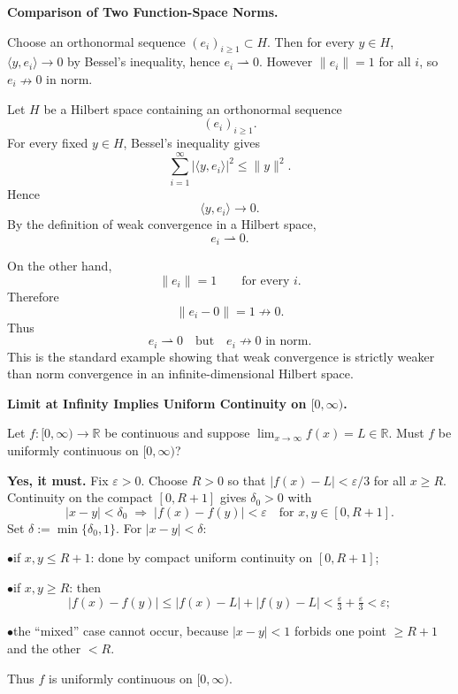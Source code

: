 \begin{problem}[CP-II-0263]
\label{prob:cp-ii-0263}
\textbf{Comparison of Two Function-Space Norms.}

\hspace*{1.5em}Choose an orthonormal sequence $(e_i)_{i\ge1}\subset H$.
		Then for every $y\in H$,
		$\langle y,e_i\rangle\to0$ by Bessel's inequality,
		hence $e_i\rightharpoonup0$.
		However $\|e_i\|=1$ for all $i$,
		so $e_i\nrightarrow0$ in norm.
\end{problem}

\begin{solution}
Let \(H\) be a Hilbert space containing an orthonormal sequence
\[
(e_i)_{i\ge1}.
\]
For every fixed \(y\in H\), Bessel's inequality gives
\[
\sum_{i=1}^{\infty}|\langle y,e_i\rangle|^2\le \|y\|^2.
\]
Hence
\[
\langle y,e_i\rangle\to0.
\]
By the definition of weak convergence in a Hilbert space,
\[
\boxed{e_i\rightharpoonup0.}
\]

On the other hand,
\[
\|e_i\|=1
\qquad\text{for every }i.
\]
Therefore
\[
\|e_i-0\|=1\nrightarrow0.
\]
Thus
\[
\boxed{
e_i\rightharpoonup0
\quad\text{but}\quad
e_i\not\to0\text{ in norm}.
}
\]
This is the standard example showing that weak convergence is strictly weaker than norm
convergence in an infinite-dimensional Hilbert space.
\end{solution}


\begin{problem}[CP-II-0264]
\label{prob:cp-ii-0264}
\textbf{Limit at Infinity Implies Uniform Continuity on $[0,\infty)$.}

\hspace*{1.5em}Let $f:[0,\infty)\to\mathbb R$ be continuous and suppose $\lim_{x\to\infty} f(x)=L\in\mathbb R$.
Must $f$ be uniformly continuous on $[0,\infty)$?
\end{problem}

\begin{solution}
\textbf{Yes, it must.}
Fix $\varepsilon>0$. Choose $R>0$ so that $\lvert f(x)-L\rvert<\varepsilon/3$ for all $x\ge R$.
Continuity on the compact $[0,R+1]$ gives $\delta_0>0$ with
\[
\lvert x-y\rvert<\delta_0 \;\Rightarrow\; \lvert f(x)-f(y)\rvert<\varepsilon
\quad\text{for } x,y\in[0,R+1].
\]
Set $\delta:=\min\{\delta_0,1\}$. For $\lvert x-y\rvert<\delta$:

	\par\smallskip\noindent\(\bullet\)\quad if $x,y\le R+1$: done by compact uniform continuity on $[0,R+1]$;
	\par\smallskip\noindent\(\bullet\)\quad if $x,y\ge R$: then
	\[
	\lvert f(x)-f(y)\rvert
	\le \lvert f(x)-L\rvert+\lvert f(y)-L\rvert
	< \tfrac{\varepsilon}{3}+\tfrac{\varepsilon}{3}
	< \varepsilon;
	\]
	\par\smallskip\noindent\(\bullet\)\quad the ``mixed'' case cannot occur, because $\lvert x-y\rvert<1$ forbids one point $\ge R+1$
	and the other $<R$.

Thus $f$ is uniformly continuous on $[0,\infty)$.
\end{solution}

